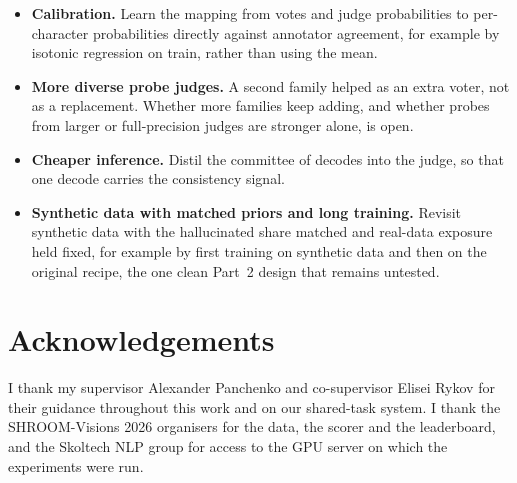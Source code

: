 \begin{itemize}
    \item \textbf{Calibration.} Learn the mapping from votes and judge probabilities to per-character probabilities directly against annotator agreement, for example by isotonic regression on train, rather than using the mean.
    \item \textbf{More diverse probe judges.} A second family helped as an extra voter, not as a replacement. Whether more families keep adding, and whether probes from larger or full-precision judges are stronger alone, is open.
    \item \textbf{Cheaper inference.} Distil the committee of decodes into the judge, so that one decode carries the consistency signal.
    \item \textbf{Synthetic data with matched priors and long training.} Revisit synthetic data with the hallucinated share matched and real-data exposure held fixed, for example by first training on synthetic data and then on the original recipe, the one clean Part~2 design that remains untested.
\end{itemize}

\newpage
\chapter*{Acknowledgements}
I thank my supervisor Alexander Panchenko and co-supervisor Elisei Rykov for their guidance throughout this work and on our shared-task system. I thank the SHROOM-Visions 2026 organisers for the data, the scorer and the leaderboard, and the Skoltech NLP group for access to the GPU server on which the experiments were run.
